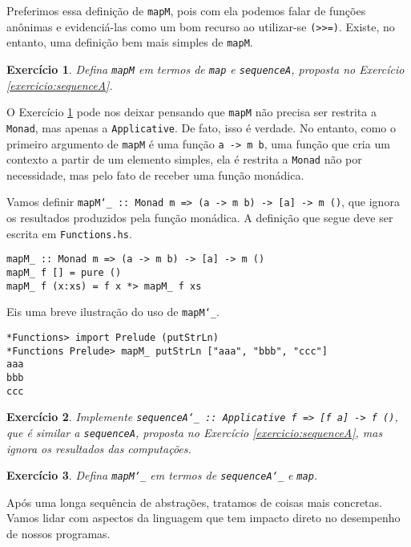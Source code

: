 \documentclass[a4paper]{article}
\newtheorem{exercicio}{Exercício}
\begin{document}
Preferimos essa definição de \texttt{mapM}, pois com ela podemos falar de funções anônimas e evidenciá-las como um bom recurso ao utilizar-se \texttt{(>>=)}.
Existe, no entanto, uma definição bem mais simples de \texttt{mapM}.

\begin{exercicio} \label{exercicio:mapM}
	Defina \emph{\texttt{mapM}} em termos de \emph{\texttt{map}} e \emph{\texttt{sequenceA}}, proposta no Exercício \ref{exercicio:sequenceA}.
\end{exercicio}

O Exercício \ref{exercicio:mapM} pode nos deixar pensando que \texttt{mapM} não precisa ser restrita a \texttt{Monad}, mas apenas a \texttt{Applicative}.
De fato, isso é verdade.
No entanto, como o primeiro argumento de \texttt{mapM} é uma função \texttt{a -> m b}, uma função que cria um contexto a partir de um elemento simples, ela é restrita a \texttt{Monad} não por necessidade, mas pelo fato de receber uma função monádica.

Vamos definir \texttt{mapM\char`_ \quad:: Monad m => (a -> m b) -> [a] -> m ()}, que ignora os resultados produzidos pela função monádica.
A definição que segue deve ser escrita em \texttt{Functions.hs}.

\begin{verbatim}
mapM_ :: Monad m => (a -> m b) -> [a] -> m ()
mapM_ f [] = pure ()
mapM_ f (x:xs) = f x *> mapM_ f xs
\end{verbatim}

Eis uma breve ilustração do uso de \texttt{mapM\char`_}.

\begin{verbatim}
*Functions> import Prelude (putStrLn)
*Functions Prelude> mapM_ putStrLn ["aaa", "bbb", "ccc"]
aaa
bbb
ccc
\end{verbatim}

\begin{exercicio}
	Implemente \emph{\texttt{sequenceA\char`_ \quad:: Applicative f => [f a] -> f ()}}, que é similar a \emph{\texttt{sequenceA}}, proposta no Exercício \ref{exercicio:sequenceA}, mas ignora os resultados das computações.
\end{exercicio}

\begin{exercicio}
	Defina \emph{\texttt{mapM\char`_}} em termos de \emph{\texttt{sequenceA\char`_}} e \emph{\texttt{map}}.
\end{exercicio}

Após uma longa sequência de abstrações, tratamos de coisas mais concretas.
Vamos lidar com aspectos da linguagem que tem impacto direto no desempenho de nossos programas.
\end{document}
